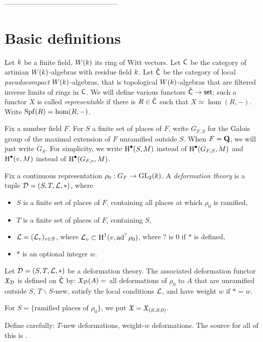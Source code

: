 \documentclass[phd,cornellheadings,draft]{cornell}
\begin{document}
------------------------------------------------





\section{Basic definitions}

Let $k$ be a finite field, $W(k)$ its ring of Witt vectors. 
Let $\mathsf{C}$ be the category of artinian $W(k)$-algebras with residue field $k$. 
Let $\hat{\mathsf{C}}$ be the category of local \emph{pseudocompact} $W(k)$-algebras, that is topological $W(k)$-algebras that are filtered inverse limits of rings in $\mathsf{C}$. 
We will define various functors $\hat{\mathsf{C}}\to \mathsf{set}$; such a functor $X$ is called \emph{representable} if there is $R\in \hat{\mathsf{C}}$ such that $X\simeq \hom(R,-)$. 
Write $\operatorname{Spf}(R)=\hom(R,-)$. 

Fix a number field $F$. 
For $S$ a finite set of places of $F$, write $G_{F,S}$ for the Galois group of the maximal extension of $F$ unramified outside $S$. 
When $F=\mathbf{Q}$, we will just write $G_S$. For simplicity, we write 
$\operatorname{H}^\bullet(S,M)$ instead of $\operatorname{H}^\bullet(G_{F,S},M)$ and 
$\operatorname{H}^\bullet(v,M)$ instead of $\operatorname{H}^\bullet(G_{F,v},M)$. 

Fix a continuous representation $\rho_0:G_F\to \operatorname{GL}_2(k)$. A \emph{deformation theory} is a tuple $\mathcal{D}=(S,T,\mathcal{L},\ast)$, where 
\begin{itemize}
  \item $S$ is a finite set of places of $F$, containing all places at which $\rho_0$ is ramified, 
  \item $T$ is a finite set of places of $F$, containing $S$, 
  \item $\mathcal{L}=(\mathcal{L}_v)_{v\in S}$, where $\mathcal{L}_v\subset \operatorname{H}^1(v,\operatorname{ad}^?\rho_0)$, where $?$ is $0$ if $\ast$ is defined, 
  \item $\ast$ is an optional integer $w$. 
\end{itemize}

\begin{definition}
Let $\mathcal{D}=(S,T,\mathcal{L},\ast)$ be a deformation theory. 
The associated deformation functor $\mathfrak{X}_{\mathcal{D}}$ is defined on $\hat{\mathsf{C}}$ by: $\mathfrak{X}_{\mathcal{D}}(A)=$ all deformations of $\rho_0$ to $A$ that are unramified outside $S$, $T\smallsetminus S$-new, satisfy the local conditions $\mathcal{L}$, and have weight $w$ if $\ast=w$. 
\end{definition}

For $S=\{\text{ramified places of }\rho_0\}$, we put $\mathfrak{X}=\mathfrak{X}_{(S,S,0)}$. 

Define carefully: $T$-new deformations, weight-$w$ deformations. The source for 
all of this is \cite{mazur-1995}. 





\printbibliography
\end{document}
